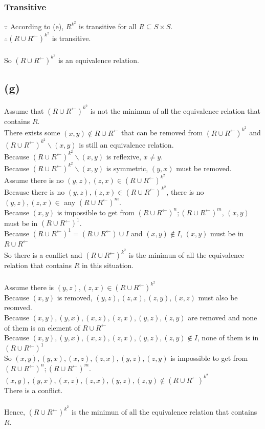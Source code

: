 \documentclass{article} %
\begin{document}
\subsubsection*{Transitive}
$\because$ According to (e), $R^{k^2}$ is transitive for all $R \subseteq S\times S$.\\
$\therefore (R\cup R^{\gets})^{k^2}$ is transitive.\\
\\
So $(R\cup R^{\gets})^{k^2}$ is an equivalence relation.\\
\subsection*{(g)}
Assume that $(R\cup R^{\gets})^{k^2}$ is not the minimun of all the equivalence relation that contains $R$.\\
There exists some $(x, y) \notin R\cup R^{\gets}$ that can be removed from $(R\cup R^{\gets})^{k^2}$ and $(R\cup R^{\gets})^{k^2}\backslash (x, y)$ is still an equivalence relation.\\
Because $(R\cup R^{\gets})^{k^2}\backslash (x, y)$ is reflexive, $x \neq y$.\\
Because $(R\cup R^{\gets})^{k^2}\backslash (x, y)$ is symmetric, $(y, x)$ must be removed.\\
Assume there is no $(y, z), (z, x) \in (R\cup R^{\gets})^{k^2}$\\
Because there is no $(y, z), (z, x) \in (R\cup R^{\gets})^{k^2}$, there is no $(y, z), (z, x) \in$ any $(R\cup R^{\gets})^{m}$.\\
Because $(x, y)$ is impossible to get from $(R\cup R^{\gets})^n;(R\cup R^{\gets})^m$, $(x, y)$ must be in $(R\cup R^{\gets})^{1}$.\\
Because $(R\cup R^{\gets})^1 = (R\cup R^{\gets}) \cup I$ and $(x, y) \notin I$, $(x, y)$ must be in $R\cup R^{\gets}$\\
So there is a conflict and $(R\cup R^{\gets})^{k^2}$ is the minimun of all the equivalence relation that contains $R$ in this situation.\\
\\
Assume there is $(y, z), (z, x) \in (R\cup R^{\gets})^{k^2}$\\
Because $(x, y)$ is removed, $(y, z), (z, x), (z, y), (x, z)$ must also be reomved.\\
Because $(x, y), (y, x), (x, z), (z, x), (y, z), (z, y)$ are removed and none of them is an element of $R\cup R^{\gets}$\\
Because $(x, y), (y, x), (x, z), (z, x), (y, z), (z, y) \notin I$, none of them is in $(R\cup R^{\gets})^{1}$\\
So $(x, y), (y, x), (x, z), (z, x), (y, z), (z, y)$ is impossible to get from $(R\cup R^{\gets})^n;(R\cup R^{\gets})^m$.\\
$(x, y), (y, x), (x, z), (z, x), (y, z), (z, y)\notin (R\cup R^{\gets})^{k^2}$\\
There is a conflict.\\
\\
Hence, $(R\cup R^{\gets})^{k^2}$ is the minimun of all the equivalence relation that contains $R$.\\
\end{document}
